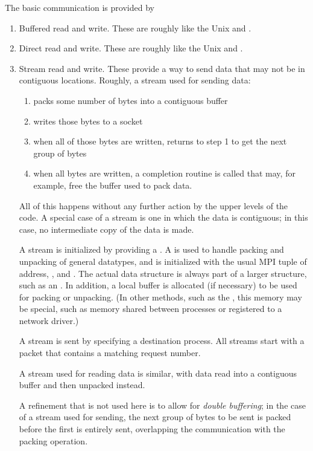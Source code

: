 The basic communication is provided by
\begin{enumerate}
\item Buffered read and write.  These are roughly like the Unix
 and .
\item Direct read and write.  These are roughly like the Unix
 and .  
\item Stream read and write.  These provide a way to send data that
may not be in contiguous locations.  Roughly, a stream used for
    sending data:
    \begin{enumerate}
    \item packs some number of bytes into a contiguous buffer
    \item writes those bytes to a socket
    \item when all of those bytes are written, returns to step 1 to
    get the next group of bytes
    \item when all bytes are written, a completion routine is called
    that may, for example, free the buffer used to pack data.
    \end{enumerate}
    All of this happens without any further action by the upper levels
    of the code.  A special case of a stream is one in which the data
    is contiguous; in this case, no intermediate copy of the data is
    made.

    A stream is initialized by providing a .  A
     is used to handle packing and unpacking of general 
    datatypes, and is initialized with the usual MPI tuple of
     address, , and .  The
    actual  data structure is always part of a larger 
    structure, such as an .  In addition, 
    a local buffer is allocated (if necessary) to be used for packing
    or unpacking.  (In other methods, such as the \shmemname, this
    memory may be special, such as memory shared between processes or
    registered to a network driver.)  

    A stream is sent by specifying a destination process.  All streams
    start with a  packet that contains a
    matching request number.

    A stream used for reading data is similar, with data read into a
    contiguous buffer and then unpacked instead.

    A refinement that is not used here is to allow for \emph{double
    buffering}; in the case of a stream used for sending, the next
    group of bytes to be sent is packed before the first is entirely
    sent, overlapping the communication with the packing operation.


\end{enumerate}

